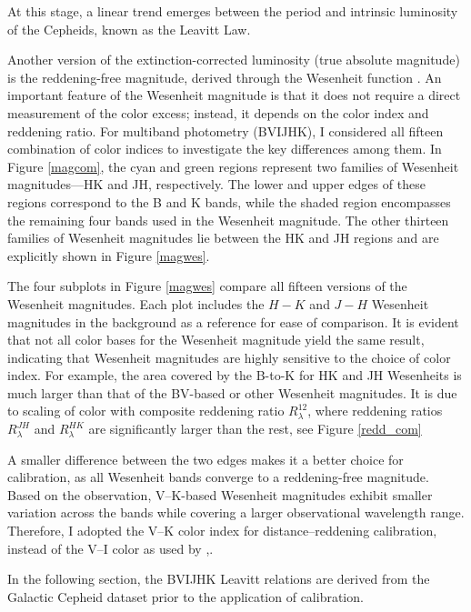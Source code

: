 At this stage, a linear trend emerges between the period and intrinsic luminosity of the Cepheids, known as the Leavitt Law.

Another version of the extinction-corrected luminosity (true absolute magnitude) is the reddening-free magnitude, derived through the Wesenheit function \citep{1982madore}. An important feature of the Wesenheit magnitude is that it does not require a direct measurement of the color excess; instead, it depends on the color index and reddening ratio. For multiband photometry (BVIJHK), I considered all fifteen combination of color indices to investigate the key differences among them. In Figure \ref{magcom}, the cyan and green regions represent two families of Wesenheit magnitudes—HK and JH, respectively. The lower and upper edges of these regions correspond to the B and K bands, while the shaded region encompasses the remaining four bands used in the Wesenheit magnitude. The other thirteen families of Wesenheit magnitudes lie between the HK and JH regions and are explicitly shown in Figure \ref{magwes}.
 


 

The four subplots in Figure \ref{magwes} compare all fifteen versions of the Wesenheit magnitudes. Each plot includes the $H-K$ and $J-H$ Wesenheit magnitudes in the background as a reference for ease of comparison. It is evident that not all color bases for the Wesenheit magnitude yield the same result, indicating that Wesenheit magnitudes are highly sensitive to the choice of color index. For example, the area covered by the B-to-K for HK and JH Wesenheits is much larger than that of the BV-based or other Wesenheit magnitudes. It is due to scaling of color with composite reddening ratio $R^{12}_\lambda$, where reddening ratios $R^{JH}_\lambda$ and $R^{HK}_\lambda$ are significantly larger than the rest, see Figure \ref{redd_com}


A smaller difference between the two edges makes it a better choice for calibration, as all Wesenheit bands converge to a reddening-free magnitude. Based on the observation, V–K-based Wesenheit magnitudes exhibit smaller variation across the bands while covering a larger observational wavelength range. Therefore, I adopted the V–K color index for distance–reddening calibration, instead of the V–I color as used by \cite{2017madore},. 

In the following section, the BVIJHK Leavitt relations are derived from the Galactic Cepheid dataset prior to the application of calibration.

